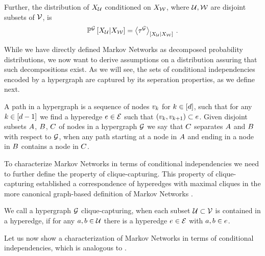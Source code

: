 Further, the distribution of $X_{\mathcal{U}}$ conditioned on $X_{\mathcal{W}}$, where $\mathcal{U},\mathcal{W}$ are disjoint subsets of $\mathcal{V}$, is
\begin{align*}
    \mathbb{P}^{\mathcal{G}}\left[X_{\mathcal{U}}|X_{\mathcal{W}}\right]
    = \left\langle \tau^{\mathcal{G}}\right\rangle_{\left[ X_{\mathcal{U}} | X_{\mathcal{W}} \right]} \, .
\end{align*}

While we have directly defined Markov Networks as decomposed probability distributions, we now want to derive assumptions on a distribution assuring that such decompositions exist.
As we will see, the sets of conditional independencies encoded by a hypergraph are captured by its seperation properties, as we define next.

\begin{definition}
    A path in a hypergraph is a sequence of nodes $v_{k}$ for $k\in[d]$, such that for any $k\in[d-1]$ we find a hyperedge $e\in\mathcal{E}$ such that $(v_{k}, v_{k+1})\subset e$.
    Given disjoint subsets $A$, $B$, $C$ of nodes in a hypergraph $\mathcal{G}$ we say that $C$ separates $A$ and $B$ with respect to $\mathcal{G}$, when any path starting at a node in $A$ and ending in a node in $B$ contains a node in $C$.
\end{definition}

To characterize Markov Networks in terms of conditional independencies we need to further define the property of clique-capturing.
This property of clique-capturing established a correspondence of hyperedges with maximal cliques in the more canonical graph-based definition of Markov Networks \cite{koller_probabilistic_2009}.

\begin{definition}
    \label{def:ccHypergraph}
    We call a hypergraph $\mathcal{G}$ clique-capturing, when each subset $\mathcal{U}\subset\mathcal{V}$ is contained in a hyperedge, if for any $a,b\in\mathcal{U}$ there is a hyperedge $e\in\mathcal{E}$ with $a,b\in e$.
\end{definition}

Let us now show a characterization of Markov Networks in terms of conditional independencies, which is analogous to .

